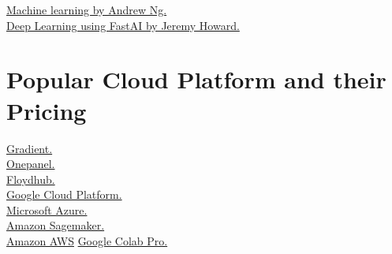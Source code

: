 \documentclass[a4paper,10pt]{article}
\begin{document}
\href{https://www.coursera.org/learn/machine-learning}{Machine learning by Andrew Ng.}\\
\href{https://www.usfca.edu/data-institute/certificates/deep-learning-part-one}{Deep Learning using FastAI  by Jeremy Howard.}


\section{Popular Cloud Platform and their Pricing}

\href{https://gradient.paperspace.com/pricing}{Gradient.}\\
\href{https://www.onepanel.io/core/core-pricing}{Onepanel.}\\
\href{https://www.floydhub.com/pricing}{Floydhub.}\\
\href{https://cloud.google.com/pricing/list}{Google Cloud Platform.}\\
\href{https://azure.microsoft.com/en-us/pricing/details/virtual-machines/linux/}{Microsoft Azure.}\\
\href{https://aws.amazon.com/sagemaker/pricing/}{Amazon Sagemaker.}\\
\href{https://aws.amazon.com/}{Amazon AWS}
\href{https://colab.research.google.com/signup}{Google Colab Pro.}\\





\printbibliography
\end{document}
